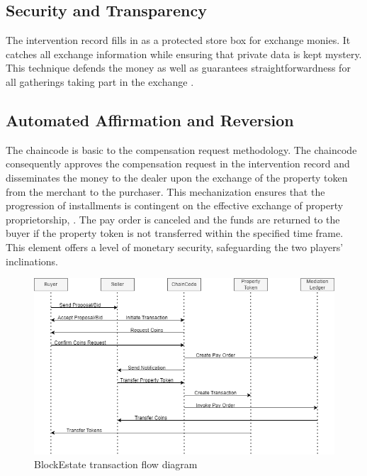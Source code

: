 \documentclass[3p,times]{elsarticle}
\begin{document}
\subsection{Security and Transparency}

The intervention record fills in as a protected store box for exchange monies. It catches all exchange information while ensuring that private data is kept mystery. This technique defends the money as well as guarantees straightforwardness for all gatherings taking part in the exchange \cite{citesladic2021blockchain}.

\subsection{Automated Affirmation and Reversion}

The chaincode is basic to the compensation request methodology. The chaincode consequently approves the compensation request in the intervention record and disseminates the money to the dealer upon the exchange of the property token from the merchant to the purchaser. This mechanization ensures that the progression of installments is contingent on the effective exchange of property proprietorship, \cite{mashatan2021usurping}. The pay order is canceled and the funds are returned to the buyer if the property token is not transferred within the specified time frame. This element offers a level of monetary security, safeguarding the two players' inclinations.

\begin{figure}[H]
    \centering
    \includegraphics[width=1\linewidth]{images/state flow diagram.drawio.png}
    \caption{BlockEstate transaction flow diagram}
    \label{fig:fig2}
\end{figure}
\end{document}
